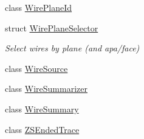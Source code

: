 \begin{DoxyCompactItemize}
class \hyperlink{class_wire_cell_1_1_wire_plane_id}{Wire\+Plane\+Id}
\item 
struct \hyperlink{struct_wire_cell_1_1_wire_plane_selector}{Wire\+Plane\+Selector}
\begin{DoxyCompactList}\small\item\em Select wires by plane (and apa/face) \end{DoxyCompactList}\item 
class \hyperlink{class_wire_cell_1_1_wire_source}{Wire\+Source}
\item 
class \hyperlink{class_wire_cell_1_1_wire_summarizer}{Wire\+Summarizer}
\item 
class \hyperlink{class_wire_cell_1_1_wire_summary}{Wire\+Summary}
\item 
class \hyperlink{class_wire_cell_1_1_z_s_ended_trace}{Z\+S\+Ended\+Trace}
\end{DoxyCompactItemize}
